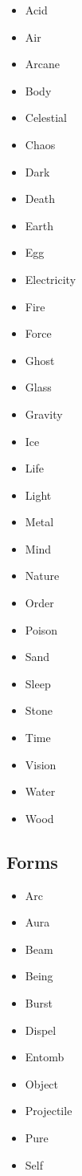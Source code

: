 \documentclass[]{article}
\providecommand{\tightlist}{%
  \setlength{\itemsep}{0pt}\setlength{\parskip}{0pt}}
\begin{document}
\begin{itemize}
\tightlist
\item
  Acid
\item
  Air
\item
  Arcane
\item
  Body
\item
  Celestial
\item
  Chaos
\item
  Dark
\item
  Death
\item
  Earth
\item
  Egg
\item
  Electricity
\item
  Fire
\item
  Force
\item
  Ghost
\item
  Glass
\item
  Gravity
\item
  Ice
\item
  Life
\item
  Light
\item
  Metal
\item
  Mind
\item
  Nature
\item
  Order
\item
  Poison
\item
  Sand
\item
  Sleep
\item
  Stone
\item
  Time
\item
  Vision
\item
  Water
\item
  Wood
\end{itemize}

\subsection{Forms}\label{forms}

\begin{itemize}
\tightlist
\item
  Arc
\item
  Aura
\item
  Beam
\item
  Being
\item
  Burst
\item
  Dispel
\item
  Entomb
\item
  Object
\item
  Projectile
\item
  Pure
\item
  Self
\end{itemize}
\end{document}
